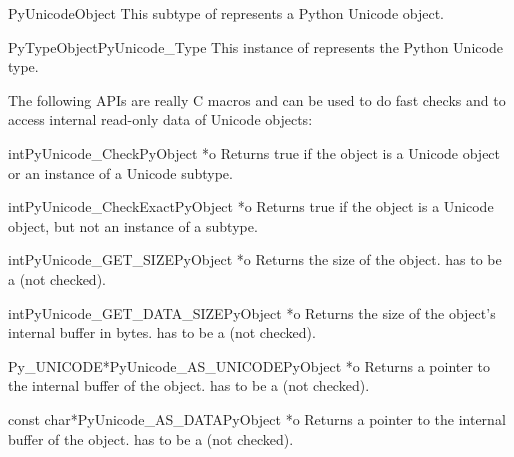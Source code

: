 \begin{ctypedesc}{PyUnicodeObject}
  This subtype of  represents a Python Unicode object.
\end{ctypedesc}

\begin{cvardesc}{PyTypeObject}{PyUnicode_Type}
  This instance of  represents the Python Unicode
  type.
\end{cvardesc}

The following APIs are really C macros and can be used to do fast
checks and to access internal read-only data of Unicode objects:

\begin{cfuncdesc}{int}{PyUnicode_Check}{PyObject *o}
  Returns true if the object  is a Unicode object or an
  instance of a Unicode subtype.
\end{cfuncdesc}

\begin{cfuncdesc}{int}{PyUnicode_CheckExact}{PyObject *o}
  Returns true if the object  is a Unicode object, but not an
  instance of a subtype.
\end{cfuncdesc}

\begin{cfuncdesc}{int}{PyUnicode_GET_SIZE}{PyObject *o}
  Returns the size of the object.   has to be a
   (not checked).
\end{cfuncdesc}

\begin{cfuncdesc}{int}{PyUnicode_GET_DATA_SIZE}{PyObject *o}
  Returns the size of the object's internal buffer in bytes.  
  has to be a  (not checked).
\end{cfuncdesc}

\begin{cfuncdesc}{Py_UNICODE*}{PyUnicode_AS_UNICODE}{PyObject *o}
  Returns a pointer to the internal  buffer of the
  object.   has to be a  (not checked).
\end{cfuncdesc}

\begin{cfuncdesc}{const char*}{PyUnicode_AS_DATA}{PyObject *o}
  Returns a pointer to the internal buffer of the object.
   has to be a  (not checked).
\end{cfuncdesc}


